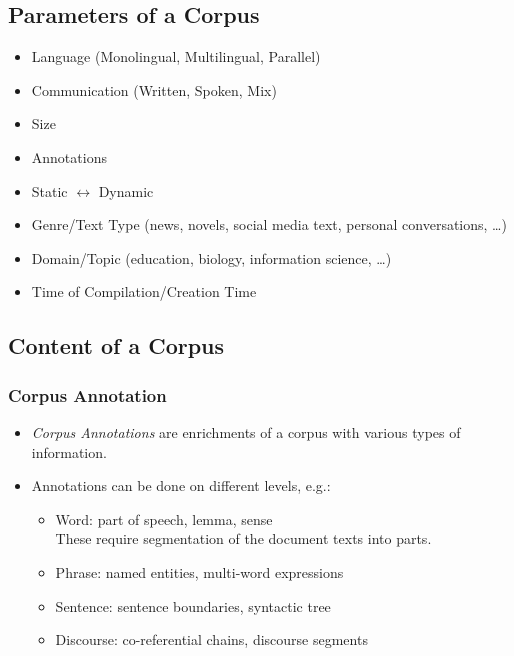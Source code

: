         \subsection{Parameters of a Corpus} %
            \begin{itemize}
            	\item Language (Monolingual, Multilingual, Parallel)
            	\item Communication (Written, Spoken, Mix)
            	\item Size
            	\item Annotations
            	\item Static \(\leftrightarrow\) Dynamic
            	\item Genre/Text Type (news, novels, social media text, personal conversations, \dots)
            	\item Domain/Topic (education, biology, information science, \dots)
            	\item Time of Compilation/Creation Time
            \end{itemize}

        \subsection{Content of a Corpus} %
            \subsubsection{Corpus Annotation} %
                \begin{itemize}
                	\item \textit{Corpus Annotations} are enrichments of a corpus with various types of information.
                	\item Annotations can be done on different levels, e.g.:
                		\begin{itemize}
                			\item Word: part of speech, lemma, sense \\ These require segmentation of the document texts into parts.
                			\item Phrase: named entities, multi-word expressions
                			\item Sentence: sentence boundaries, syntactic tree
                			\item Discourse: co-referential chains, discourse segments
                		\end{itemize}
                \end{itemize}

